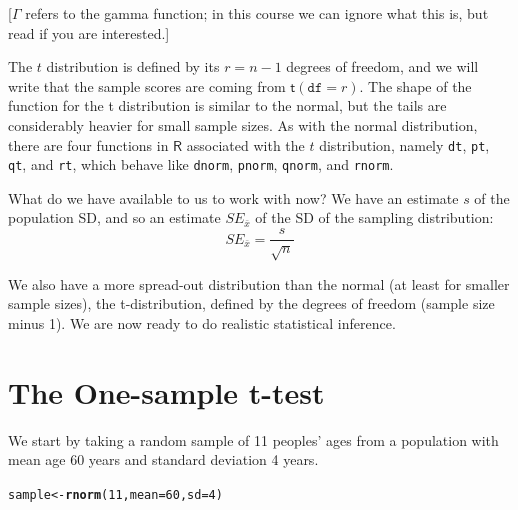 \documentclass[12pt]{book}\usepackage[]{graphicx}\usepackage[]{color}
\makeatletter
\newcommand{\hlnum}[1]{\textcolor[rgb]{0.686,0.059,0.569}{#1}}%
\newcommand{\hlstd}[1]{\textcolor[rgb]{0.345,0.345,0.345}{#1}}%
\newcommand{\hlkwb}[1]{\textcolor[rgb]{0.69,0.353,0.396}{#1}}%
\newcommand{\hlkwc}[1]{\textcolor[rgb]{0.333,0.667,0.333}{#1}}%
\newcommand{\hlkwd}[1]{\textcolor[rgb]{0.737,0.353,0.396}{\textbf{#1}}}%
\newenvironment{kframe}{%
 \def\at@end@of@kframe{}%
 \ifinner\ifhmode%
  \def\at@end@of@kframe{\end{minipage}}%
  \begin{minipage}{\columnwidth}%
 \fi\fi%
 \def\FrameCommand##1{\hskip\@totalleftmargin \hskip-\fboxsep
 \colorbox{shadecolor}{##1}\hskip-\fboxsep
     \hskip-\linewidth \hskip-\@totalleftmargin \hskip\columnwidth}%
 \MakeFramed {\advance\hsize-\width
   \@totalleftmargin\z@ \linewidth\hsize
   \@setminipage}}%
 {\par\unskip\endMakeFramed%
 \at@end@of@kframe}
\newenvironment{knitrout}{}{} %
\makeatother
\begin{document}
[$\Gamma$ refers to the gamma function; in this course we can ignore what this is, but read \cite{kerns} if you are interested.]

The $t$ distribution is defined by its $r=n-1$ degrees of freedom, and we will write that the sample scores are coming from $\mathsf{t}(\mathtt{df}=r)$. The shape of the function for the t distribution is similar to the normal, but the tails are considerably heavier for small sample sizes.  As with the normal distribution, there are four functions in $\mathsf{R}$ associated with the $t$ distribution, namely \texttt{dt}, \texttt{pt}, \texttt{qt}, and \texttt{rt}, which behave like \texttt{dnorm}, \texttt{pnorm}, \texttt{qnorm}, and \texttt{rnorm}.


What do we have available to us to work with now? We have an estimate
$s$ of the population SD, and so an estimate $SE_{\bar{x}}$ of the SD
of the sampling distribution:
\begin{equation}
SE_{\bar{x}} = \frac{s}{\sqrt{n}}
\end{equation}

We also have a more spread-out distribution than the normal (at least for smaller sample sizes), the
t-distribution, defined by the degrees of freedom (sample size minus 1).  We are
now ready to do realistic statistical inference.


\section{The One-sample t-test}


We start by taking a random sample of
11 peoples' ages from a population with mean age 60 years and standard deviation 4 years.

\begin{knitrout}
\color{fgcolor}\begin{kframe}
\begin{alltt}
\hlstd{sample} \hlkwb{<-} \hlkwd{rnorm}\hlstd{(}\hlnum{11}\hlstd{,}\hlkwc{mean}\hlstd{=}\hlnum{60}\hlstd{,}\hlkwc{sd}\hlstd{=}\hlnum{4}\hlstd{)}
\end{alltt}
\end{kframe}
\end{knitrout}

\noindent
\end{document}
